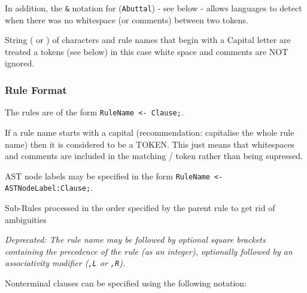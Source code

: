 In addition, the \texttt{\&\textbar{}} notation for (\texttt{Abuttal}) - see below - allows languages to detect when there was no whitespace (or comments) between two tokens.

String (\textquotedbl{} or \textquotesingle{}) of characters and rule names that begin with a Capital letter are treated a tokens (see below) in this case white space and comments are NOT ignored.

\subsubsection{Rule Format}

The rules are of the form \texttt{RuleName \textless{}- Clause;}.

If a rule name starts with a capital (recommendation: capitalise the whole rule name) then it is considered to be a TOKEN. This just means that whitespaces and comments are included in the matching / token rather than being supressed.

AST node labels may be specified in the form \texttt{RuleName \textless{}- ASTNodeLabel:Clause;}.

Sub-Rules processed in the order specified by the parent rule to get rid of ambiguities

\emph{Deprecated: The rule name may be followed by optional square brackets containing the precedence of the
rule (as an integer), optionally followed by an associativity modifier (\texttt{,L} or \texttt{,R}).}

Nonterminal clauses can be specified using the following notation:

